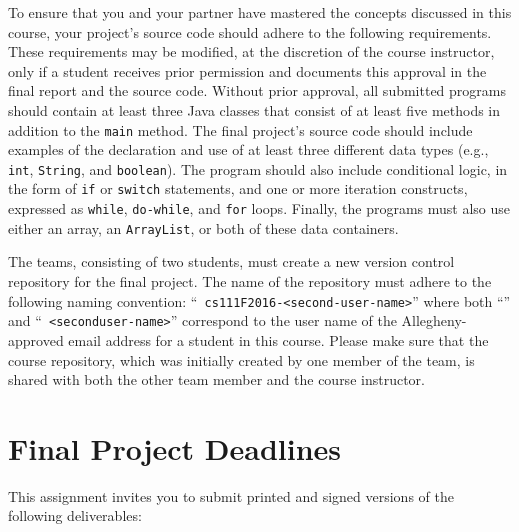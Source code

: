 To ensure that you and your partner have mastered the concepts discussed in this course, your project's source code
should adhere to the following requirements. These requirements may be modified, at the discretion of the course
instructor, only if a student receives prior permission and documents this approval in the final report and the source
code. Without prior approval, all submitted programs should contain at least three Java classes that consist of at least
five methods in addition to the {\tt main} method. The final project's source code should include examples of the
declaration and use of at least three different data types (e.g., {\tt int}, {\tt String}, and {\tt boolean}). The
program should also include conditional logic, in the form of {\tt if} or {\tt switch} statements, and one or more
iteration constructs, expressed as {\tt while}, {\tt do-while}, and {\tt for} loops. Finally, the programs must also use
either an array, an {\tt ArrayList}, or both of these data containers.

The teams, consisting of two students, must create a new version control repository for the final project.  The name of
the repository must adhere to the following naming convention: ``{\tt
cs111F2016-<second-user-name>}'' where both ``{\tt <first-user-name>}'' and ``{\tt
<second\-user-name>}'' correspond to the user name of the Allegheny-approved email address for a student in this course.
Please make sure that the course repository, which was initially created by one member of the team, is shared with both
the other team member and the course instructor.

\section*{Final Project Deadlines}

This assignment invites you to submit printed and signed versions of the following deliverables:

